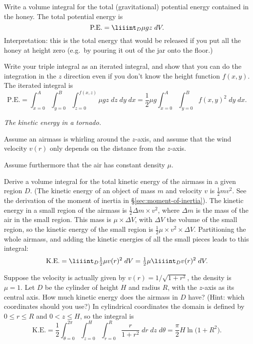 \subprob Write a volume integral for the total 
(gravitational) potential energy contained in the honey.
\answer
The total potential energy is 
\[
\text{P.E.} = \liiint _D \mu g z \; dV.
\]
Interpretation: this is the total energy that would be released if you
put all the honey at height zero (e.g.\ by pouring it out of the jar
onto the floor.)
\endanswer

\subprob Write your triple integral as an iterated integral, 
and show that you can do the integration in the $z$ direction even if
you don't know the height function $f(x, y)$.
\answer
The iterated integral is
\[
\text{P.E.} = 
\int_{x=0}^A \int_{y=0}^B \int_{z=0}^{f(x, z)} \mu g z \; dz\; dy\;
dx
=
\frac12 \mu g
\int_{x=0}^A \int_{y=0}^B f(x, y)^2 \; dy\; dx.
\]
\endanswer

\problem \textit{The kinetic energy in a tornado.} 

Assume an airmass is whirling around the $z$-axis, and assume that
the wind velocity $v(r)$ only depends on the distance from the $z$-axis.

Assume furthermore that the air has constant density $\mu$.

\subprob Derive a volume integral for the total kinetic energy 
of the airmass in a given region $D$.  (The kinetic energy of an
object of mass $m$ and velocity $v$ is $\frac12 mv^2$.  See the
derivation of the moment of inertia in \S\ref{sec:moment-of-inertia}).
\answer
The kinetic energy in a small region of the airmass is $\frac12 \Delta
m \times v^2$, where $\Delta m$ is the mass of the air in the small
region.  This mass is $\mu\times \Delta V$, with $\Delta V$ the
volume of the small region, so the kinetic energy of the small region
is $\frac 12 \mu \times v^2\times\Delta V$.  Partitioning the
whole airmass, and adding the kinetic energies of all the small pieces
leads to this integral:
\[
\text{K.E.} = \liiint_D \tfrac12\mu v(r)^2\; dV
= \tfrac12\mu \liiint_D v(r)^2\; dV
.\]
\endanswer

\subprob Suppose the velocity is actually given by 
$v(r) = 1/\sqrt{1+r^2}$, the density is $\mu = 1$.  Let $D$ be the
cylinder of height $H$ and radius $R$, with the $z$-axis as its
central axis. How much kinetic energy does the airmass in $D$ have?
(Hint: which coordinates should you use?)
\answer
In cylindrical coordinates the domain is defined by $0\le r\le R$ and
$0< z \le H$, so the integral is
\[
\text{K.E.}
=
\frac 12
\int_{\theta=0}^{2\pi}\int_{z=0}^{H}\int_{r=0}^R
\frac{r}{1+r^2}\; dr\; dz\; d\theta
=
\frac{\pi}{2}H\ln\bigl(1+R^2\bigr).
\]
\endanswer

